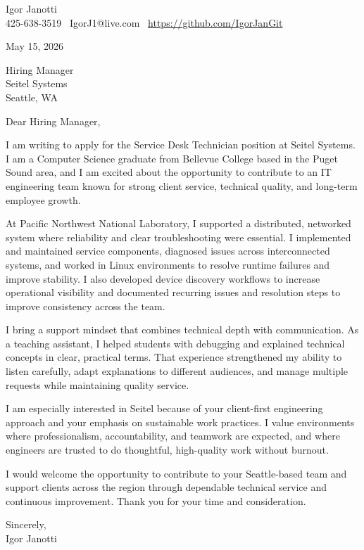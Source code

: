 \documentclass[11pt]{article}
\begin{document}
Igor Janotti\\
425-638-3519 \textbar\ IgorJ1@live.com \textbar\ \url{https://github.com/IgorJanGit}

May 15, 2026

Hiring Manager\\
Seitel Systems\\
Seattle, WA

Dear Hiring Manager,

I am writing to apply for the Service Desk Technician position at Seitel Systems. I am a Computer Science graduate from Bellevue College based in the Puget Sound area, and I am excited about the opportunity to contribute to an IT engineering team known for strong client service, technical quality, and long-term employee growth.

At Pacific Northwest National Laboratory, I supported a distributed, networked system where reliability and clear troubleshooting were essential. I implemented and maintained service components, diagnosed issues across interconnected systems, and worked in Linux environments to resolve runtime failures and improve stability. I also developed device discovery workflows to increase operational visibility and documented recurring issues and resolution steps to improve consistency across the team.

I bring a support mindset that combines technical depth with communication. As a teaching assistant, I helped students with debugging and explained technical concepts in clear, practical terms. That experience strengthened my ability to listen carefully, adapt explanations to different audiences, and manage multiple requests while maintaining quality service.

I am especially interested in Seitel because of your client-first engineering approach and your emphasis on sustainable work practices. I value environments where professionalism, accountability, and teamwork are expected, and where engineers are trusted to do thoughtful, high-quality work without burnout.

I would welcome the opportunity to contribute to your Seattle-based team and support clients across the region through dependable technical service and continuous improvement. Thank you for your time and consideration.

Sincerely,\\
Igor Janotti
\end{document}
